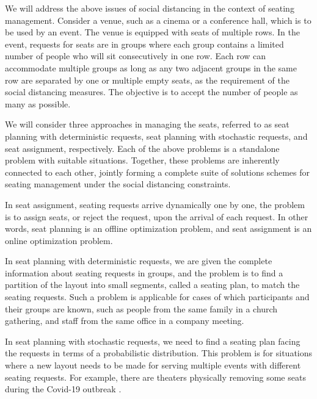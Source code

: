 We will address the above issues of social distancing in the context of seating management. Consider  a venue, such as a cinema or a conference hall, which is to be used by an event. The venue is equipped with seats of multiple rows. In the event, requests for seats are in groups where each group contains a limited number of people who will sit consecutively in one row. Each row can accommodate multiple groups as long as any two adjacent groups in the same row are separated by one or multiple empty seats, as the requirement of the social distancing measures. The objective is to accept the  number of people as many as possible.






We will consider three approaches in managing the seats, referred to as seat planning with deterministic requests, seat planning with stochastic requests, and seat assignment, respectively. Each of the above problems is a standalone problem with suitable situations. Together, these problems are inherently connected to each other, jointly forming a complete suite of solutions schemes for seating management under the social distancing constraints.


In seat assignment, seating requests arrive dynamically one by one, the problem is to assign seats, or reject the request, upon the arrival of each request. In other words, seat planning is an offline optimization problem, and seat assignment is an online optimization problem.

In seat planning with deterministic requests, we are given the complete information about seating requests in groups, and the problem is to find a partition of the layout into small segments, called a seating plan, to match the seating requests. Such a problem is applicable for cases of which participants and their groups are known, such as people from the same family in a church gathering, and staff from the same office in a company meeting.
 
In seat planning with stochastic requests, we  need to find a seating plan facing the requests in terms of a probabilistic distribution. This problem is for situations where a new layout needs to be made for serving multiple events with different seating requests. For example, there are theaters physically removing some seats during the Covid-19 outbreak \cite{Berlin_theater}.

